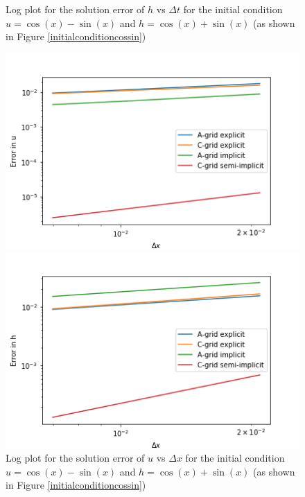 \documentclass[a4paper,12pt, notitlepage]{article}
\begin{document}
{\begin{figure} [H]
\begin{minipage}{.5\textwidth}
	\caption{\label{herrorcossindt}Log plot for the solution error of $h$ vs $\Delta t$ for the initial condition $u = \cos(x) - \sin(x)$ and $h = \cos(x) + \sin(x)$ (as shown in Figure \ref{initialconditioncossin})} 
\end{minipage}
	\begin{minipage}{.5\textwidth}
	\ContinuedFloat
	\captionsetup{width=0.9\textwidth}
	\captionsetup{justification=centering}
	\includegraphics[width=\textwidth]{uerror_compared_dx_cossin.png}
	\caption{\label{uerrorcossindx}Log plot for the solution error of $u$ vs $\Delta x$ for the initial condition $u = \cos(x) - \sin(x)$ and $h = \cos(x) + \sin(x)$ (as shown in Figure \ref{initialconditioncossin})} 
\end{minipage}
	\begin{minipage}{.5\textwidth}
	\ContinuedFloat
	\captionsetup{width=0.9\textwidth}
	\captionsetup{justification=centering}
	\includegraphics[width=\textwidth]{herror_compared_dx_cossin.png}

\end{minipage}
\end{figure}}
\end{document}
